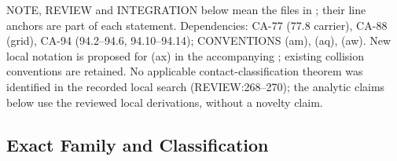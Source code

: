NOTE, REVIEW and INTEGRATION below mean the files in
; their line anchors are part of each statement.
Dependencies: CA-77 (77.8 carrier), CA-88 (grid), CA-94 (94.2--94.6, 94.10--94.14); CONVENTIONS (am), (aq), (aw).
New local notation is proposed for (ax) in the accompanying ; existing collision conventions are retained.
No applicable contact-classification theorem was identified in the recorded local search (REVIEW:268--270);
the analytic claims below use the reviewed local derivations, without a novelty claim.


\subsection{Exact Family and Classification}

